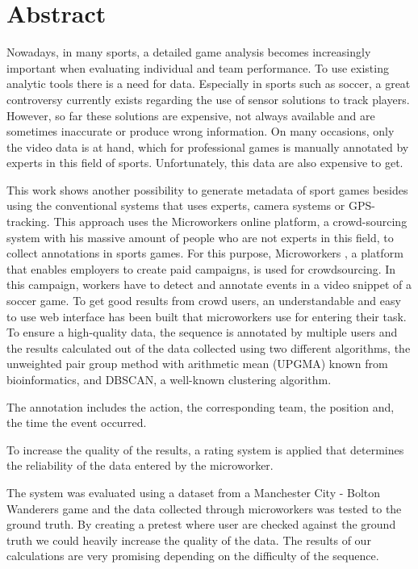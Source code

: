 \chapter{Abstract}

Nowadays, in many sports, a detailed game analysis becomes increasingly important when evaluating individual and team performance. To use existing analytic tools there is a need for data. Especially in sports such as soccer, a great controversy currently exists  regarding the use of sensor solutions to track players. However, so far these solutions are expensive, not always available and are sometimes inaccurate or produce wrong information. On many occasions, only the video data is at hand, which for professional games is manually annotated by experts in this field of sports.  Unfortunately, this data are also expensive to get.


This work shows another possibility to generate metadata of sport games besides using the conventional systems that uses experts, camera systems or GPS-tracking.
This approach uses the Microworkers online platform, a crowd-sourcing system with his massive amount of people who are not experts in this field, to collect annotations in sports games. For this purpose, Microworkers \cite{Microworkers}, a platform that enables employers to create paid campaigns, is used for crowdsourcing.
In this campaign, workers have to detect and annotate events in a video snippet of a soccer game. To get good results from crowd users, an understandable and easy to use web interface has been built that microworkers use for entering their task. 
To ensure a high-quality data, the sequence is annotated by multiple users and the results calculated out of the data collected using two different algorithms, the unweighted pair group method with arithmetic mean (UPGMA) known from bioinformatics, and DBSCAN, a well-known clustering algorithm.

The annotation includes the action, the corresponding team, the position and, the time the event occurred.

To increase the quality of the results, a rating system is applied that determines the reliability of the data entered by the microworker.

The system was evaluated using a dataset from a Manchester City - Bolton Wanderers game and the data collected through microworkers was tested to the ground truth. By creating a pretest where user are checked against the ground truth we could heavily increase the quality of the data. The results of our calculations are very promising depending on the difficulty of the sequence.